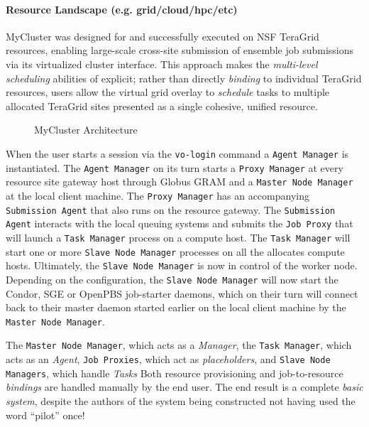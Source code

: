 \documentclass{sig-alternate}
\begin{document}
\paragraph{Resource Landscape (e.g. grid/cloud/hpc/etc)}
MyCluster was designed for and successfully executed on NSF TeraGrid
resources, enabling large-scale cross-site submission of ensemble
job submissions via its virtualized cluster interface.
This approach makes the \textit{multi-level scheduling} abilities
of \pilotjobs explicit; rather than directly \textit{binding}
to individual TeraGrid resources, users allow the virtual grid
overlay to \textit{schedule} tasks to multiple allocated TeraGrid sites
presented as a single cohesive, unified resource.

\begin{figure}[t]
    \centering
    \caption{MyCluster Architecture}
    \label{fig:mycluster_arch}
\end{figure}

When the user starts a session via the \texttt{vo-login} command a
\texttt{Agent Manager} is instantiated.
The \texttt{Agent Manager} on its turn starts a \texttt{Proxy Manager} at every
resource site gateway host through Globus GRAM and a \texttt{Master Node
Manager} at the local client machine.
The \texttt{Proxy Manager} has an accompanying \texttt{Submission Agent} that
also runs on the resource gateway.
The \texttt{Submission Agent} interacts with the local queuing systems and
submits the \texttt{Job Proxy} that will launch a \texttt{Task Manager} process
on a compute host.
The \texttt{Task Manager} will start one or more \texttt{Slave Node Manager}
processes on all the allocates compute hosts.
Ultimately, the \texttt{Slave Node Manager} is now in control of the worker
node.
Depending on the configuration, the \texttt{Slave Node Manager} will now start
the Condor, SGE or OpenPBS job-starter daemons, which on their turn will
connect back to their master daemon started earlier on the local client
machine by the \texttt{Master Node Manager}.


The \texttt{Master Node Manager}, which acts as a \textit{\pilotjob Manager},
the \texttt{Task Manager}, which acts as an \textit{\pilotjob Agent},
\texttt{Job Proxies}, which act as \textit{placeholders}, and \texttt{Slave
Node Managers}, which handle \textit{\pilotjob Tasks} Both resource
provisioning and job-to-resource \textit{bindings} are handled manually by the
end user.  The end result is a complete \textit{basic \pilotjob system},
despite the authors of the system being constructed not having used the word
``pilot'' once!~\cite{1652061}
\end{document}
